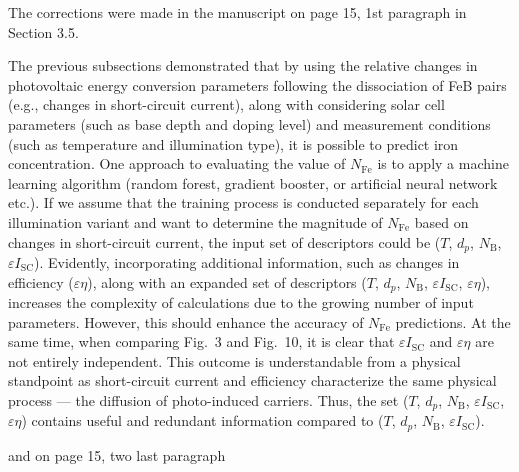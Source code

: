 \documentclass[a4paper,fleqn]{cas-sc}
\begin{document}
The corrections were made in the manuscript on page 15, 1st paragraph in Section 3.5.


\begin{mdframed}
The previous subsections demonstrated that by using the relative changes in photovoltaic energy conversion parameters following the dissociation of FeB pairs
(e.g., changes in short-circuit current),
along with considering solar cell parameters (such as base depth and doping level)
and measurement conditions (such as temperature and illumination type), it is possible to predict iron concentration.
One approach to evaluating the value of $N_\mathrm{Fe}$ is to apply a machine learning algorithm (random forest, gradient booster, or artificial neural network etc.).
If we assume that the training process is conducted separately for each illumination variant \textcolor[rgb]{1.00,0.07,0.00}{ and want to
determine the magnitude of $N_\mathrm{Fe}$ based on changes in short-circuit current},
the input set of descriptors could be
($T$, $d_p$, $N_\mathrm{B}$, $\varepsilon I_\mathrm{SC}$).
\textcolor[rgb]{1.00,0.07,0.00}{Evidently, incorporating additional information, such as changes in efficiency ($\varepsilon \eta$), along with an expanded
set of descriptors ($T$, $d_p$, $N_\mathrm{B}$, $\varepsilon I_\mathrm{SC}$, $\varepsilon \eta$),
increases the complexity of calculations due to the growing number of input parameters.
However, this should enhance the accuracy of $N_\mathrm{Fe}$ predictions.
At the same time, }when comparing Fig.~3 and Fig.~10, it is clear that  $\varepsilon I_\mathrm{SC}$ and $\varepsilon \eta$ are not entirely independent.
\textcolor[rgb]{1.00,0.07,0.00}{This outcome is understandable from a physical standpoint as
short-circuit current and efficiency characterize the same physical process --- the diffusion of photo-induced carriers.
Thus, the set ($T$, $d_p$, $N_\mathrm{B}$, $\varepsilon I_\mathrm{SC}$, $\varepsilon \eta$)
contains useful and redundant information compared to ($T$, $d_p$, $N_\mathrm{B}$, $\varepsilon I_\mathrm{SC}$).}
\end{mdframed}


and on page 15, two last paragraph
\end{document}
